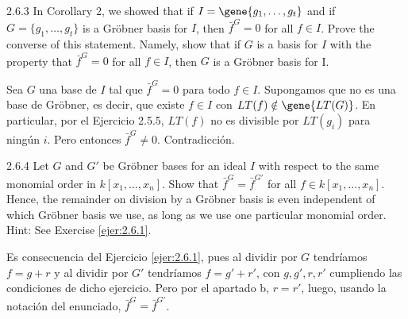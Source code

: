\documentclass[twoside]{article}
\begin{document}
\begin{ejercicio}{2.6.3}
In Corollary 2, we showed that if $I =\gene{ 
g_1,\dots , g_t}$ and if $G = \{g_1,\dots , g_t\}$ is a Gröbner
basis for $I$, then $\bar{f}^G = 0$ for all $f ∈ I$. Prove the converse of this statement. Namely, show
that if $G$ is a basis for $I$ with the property that $\bar{f}^G = 0$ for all $f ∈ I$, then $G$ is a Gröbner
basis for I.

\end{ejercicio}
\begin{solucion}
Sea $G$ una base de $I$ tal que $\bar{f}^G=0$ para todo $f\in I$. Supongamos que no es una base de Gröbner, es decir, que existe $f\in I$ con $LT(f)\notin \gene{LT(G)}$. En particular, por el Ejercicio 2.5.5, $LT(f)$ no es divisible por $LT(g_i)$ para ningún $i$. Pero entonces $\bar{f}^G \neq 0$. Contradicción.
\end{solucion}

\newpage

\begin{ejercicio}{2.6.4}
Let $G$ and $G'$ be Gröbner bases for an ideal $I$ with respect to the same monomial order
in $k[x_1,\dots , x_n]$. Show that $\bar{f}^G = \bar{f}^{G'}$
for all $f ∈ k[x_1,\dots , x_n]$. Hence, the remainder on
division by a Gröbner basis is even independent of which Gröbner basis we use, as long
as we use one particular monomial order. Hint: See Exercise \ref{ejer:2.6.1}.
\end{ejercicio}
\begin{solucion}
Es consecuencia del Ejercicio \ref{ejer:2.6.1}, pues al dividir por $G$ tendríamos $f=g+r$ y al dividir por $G'$ tendríamos $f=g'+r'$, con $g,g',r,r'$ cumpliendo las condiciones de dicho ejercicio. Pero por el apartado b, $r=r'$, luego, usando la notación del enunciado, $\bar{f}^G = \bar{f}^{G'}$.
\end{solucion}
\newpage
\end{document}
